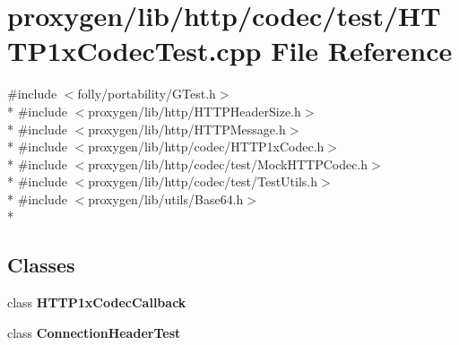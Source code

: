 \section{proxygen/lib/http/codec/test/\+H\+T\+T\+P1x\+Codec\+Test.cpp File Reference}
\label{HTTP1xCodecTest_8cpp}
{\ttfamily \#include $<$folly/portability/\+G\+Test.\+h$>$}\\*
{\ttfamily \#include $<$proxygen/lib/http/\+H\+T\+T\+P\+Header\+Size.\+h$>$}\\*
{\ttfamily \#include $<$proxygen/lib/http/\+H\+T\+T\+P\+Message.\+h$>$}\\*
{\ttfamily \#include $<$proxygen/lib/http/codec/\+H\+T\+T\+P1x\+Codec.\+h$>$}\\*
{\ttfamily \#include $<$proxygen/lib/http/codec/test/\+Mock\+H\+T\+T\+P\+Codec.\+h$>$}\\*
{\ttfamily \#include $<$proxygen/lib/http/codec/test/\+Test\+Utils.\+h$>$}\\*
{\ttfamily \#include $<$proxygen/lib/utils/\+Base64.\+h$>$}\\*
\subsection*{Classes}
\begin{DoxyCompactItemize}
\item 
class {\bf H\+T\+T\+P1x\+Codec\+Callback}
\item 
class {\bf Connection\+Header\+Test}
\end{DoxyCompactItemize}

